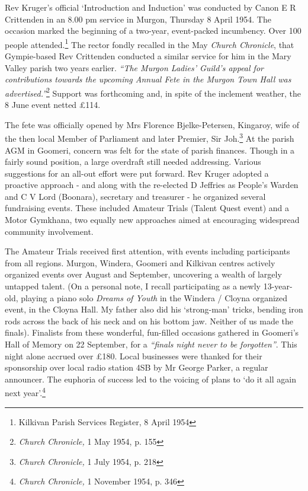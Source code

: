 Rev Kruger's official `Introduction and Induction' was conducted by Canon E R Crittenden in an 8.00 pm service in Murgon, Thursday 8 April 1954. The occasion marked the beginning of a two-year, event-packed incumbency. Over 100 people attended.\footnote{Kilkivan Parish Services Register, 8 April 1954} The rector fondly recalled in the May \emph{Church Chronicle}, that Gympie-based Rev Crittenden conducted a similar service for him in the Mary Valley parish two years earlier. \emph{``The Murgon Ladies' Guild's appeal for contributions towards the upcoming Annual Fete in the Murgon Town Hall was advertised.''}\footnote{\emph{Church Chronicle,} 1 May 1954, p. 155} Support was forthcoming and, in spite of the inclement weather, the 8 June event netted \pounds114.


The fete was officially opened by Mrs Florence Bjelke-Petersen, Kingaroy, wife of the then local Member of Parliament and later Premier, Sir Joh.\footnote{\emph{Church Chronicle,} 1 July 1954, p. 218} At the parish AGM in Goomeri, concern was felt for the state of parish finances. Though in a fairly sound position, a large overdraft still needed addressing. Various suggestions for an all-out effort were put forward. Rev Kruger adopted a proactive approach - and along with the re-elected D Jeffries as People's Warden and C V Lord (Boonara), secretary and treasurer - he organized several fundraising events. These included Amateur Trials (Talent Quest event) and a Motor Gymkhana, two equally new approaches aimed at encouraging widespread community involvement.


The Amateur Trials received first attention, with events including participants from all regions. Murgon, Windera, Goomeri and Kilkivan centres actively organized events over August and September, uncovering a wealth of largely untapped talent. (On a personal note, I recall participating as a newly 13-year-old, playing a piano solo \emph{Dreams of Youth} in the Windera / Cloyna organized event, in the Cloyna Hall. My father also did his `strong-man' tricks, bending iron rods across the back of his neck and on his bottom jaw. Neither of us made the finals). Finalists from these wonderful, fun-filled occasions gathered in Goomeri's Hall of Memory on 22 September, for a \emph{``finals night never to be forgotten''}. This night alone accrued over \pounds180. Local businesses were thanked for their sponsorship over local radio station 4SB by Mr George Parker, a regular announcer. The euphoria of success led to the voicing of plans to `do it all again next year'.\footnote{\emph{Church Chronicle,} 1 November 1954, p. 346}


